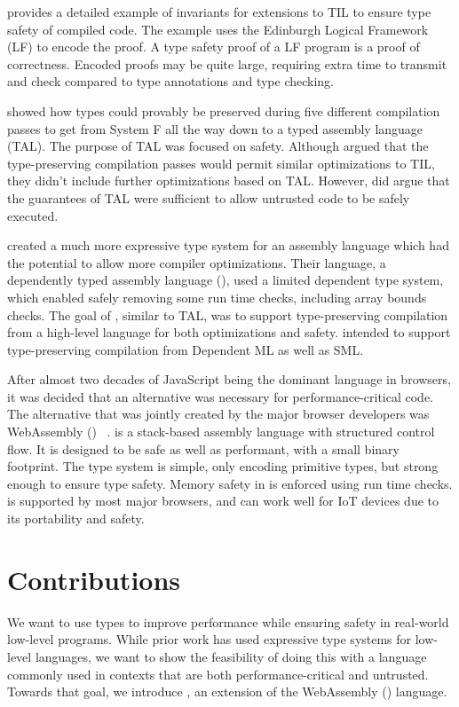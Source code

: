 \citet{PCC} provides a detailed example of invariants for extensions to TIL to ensure type safety of compiled code.
The example uses the Edinburgh Logical Framework (LF) to encode the proof.
A type safety proof of a LF program is a proof of correctness.
Encoded proofs may be quite large, requiring extra time to transmit and check compared to type annotations and type checking.

\citet{FtoTAL} showed how types could provably be preserved during five different compilation passes to get from System F all the way down to a typed assembly language (TAL).
The purpose of TAL was focused on safety.
Although \citet{FtoTAL} argued that the type-preserving compilation passes would permit similar optimizations to TIL, they didn't include further optimizations based on TAL.
However, \citet{FtoTAL} did argue that the guarantees of TAL were sufficient to allow untrusted code to be safely executed.

\citet{DTAL} created a much more expressive type system for an assembly language which had the potential to allow more compiler optimizations.
Their language, a dependently typed assembly language (\dtal), used a limited dependent type system, which enabled safely removing some run time checks, including array bounds checks.
The goal of \dtal, similar to TAL, was to support type-preserving compilation from a high-level language for both optimizations and safety.
\dtal intended to support type-preserving compilation from Dependent ML as well as SML.


After almost two decades of JavaScript being the dominant language in browsers, it was decided that an alternative was necessary for performance-critical code.
The alternative that was jointly created by the major browser developers was WebAssembly (\wasm) ~\cite{WASM}.
\wasm is a stack-based assembly language with structured control flow.
It is designed to be safe as well as performant, with a small binary footprint.
The \wasm type system is simple, only encoding primitive types, but strong enough to ensure type safety.
Memory safety in \wasm is enforced using run time checks.
\wasm is supported by most major browsers, and can work well for IoT devices due to its portability and safety.

\section{Contributions}
We want to use types to improve performance while ensuring safety in real-world low-level programs.
While prior work has used expressive type systems for low-level languages, we want to show the feasibility of doing this with a language commonly used in contexts that are both performance-critical and untrusted.
Towards that goal, we introduce \name, an extension of the WebAssembly (\wasm) language.


